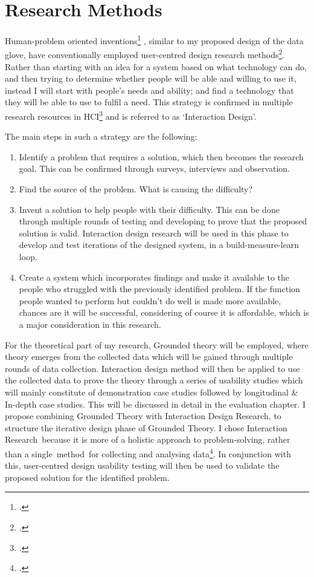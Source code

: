 \chapter{Research Methods}

Human-problem oriented inventions\footcite{Cox2008} , similar to my proposed design of the data glove, have conventionally employed user-centred design research methods\footcite{Bevan1999}. Rather than starting with an idea for a system based on what technology can do, and then trying to determine whether people will be able and willing to use it, instead I will start with people's needs and ability; and find a technology that they will be able to use to fulfil a need. This strategy is confirmed in multiple research resources in HCI\footcite{Dix2004} and is referred to as ‘Interaction Design’.

The main steps in such a strategy are the following: 
\begin{enumerate}
    \item Identify a problem that requires a solution, which then becomes the research goal. This can be confirmed through surveys, interviews and observation. 
    \item Find the source of the problem. What is causing the difficulty?
    \item Invent a solution to help people with their difficulty. This can be done through multiple rounds of testing and developing to prove that the proposed solution is valid. Interaction design research will be used in this phase to develop and test iterations of the designed system, in a build-measure-learn loop.
    \item Create a system which incorporates findings and make it available to the people who struggled with the previously identified problem. If the function people wanted to perform but couldn't do well is made more available, chances are it will be successful, considering of course it is affordable, which is a major consideration in this research.
\end{enumerate}

For the theoretical part of my research, Grounded theory will be employed, where theory emerges from the collected data which will be gained through multiple rounds of data collection. Interaction design method will then be applied to use the collected data to prove the theory through a series of usability studies which will mainly constitute of demonstration case studies followed by longitudinal \& In-depth case studies. This will be discussed in detail in the evaluation chapter.
I propose combining Grounded Theory with Interaction Design Research, to structure the iterative design phase of Grounded Theory. I chose Interaction Research because it is more of a holistic approach to problem-solving, rather than a single method for collecting and analysing data\footcite{OBrienRoryFacultyofInformationStudies2001}. In conjunction with this, user-centred design usability testing will then be used to validate the proposed solution for the identified problem. 

